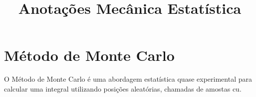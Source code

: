 \documentclass[10pt,a4paper]{article}
\title{Anotações  Mecânica Estatística}
\begin{document}
\maketitle
\tableofcontents
\newpage

\section{Método de Monte Carlo}

\begin{df}
	O Método de Monte Carlo é uma abordagem estatística quase experimental para calcular uma integral utilizando posições aleatórias, chamadas de amostas cu.
\end{df}
\end{document}
